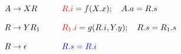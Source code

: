 
\begin{alignat*}{3}
  A &\to XR \qquad && \textcolor{red}{R.i} = f(X.x);\quad A.a = R.s \\[8pt]
  R &\to YR_{1} && \textcolor{red}{R_{1}.i} = g(R.i, Y.y);\quad R.s = R_{1}.s \\[8pt]
  R &\to \epsilon && \textcolor{blue}{R.s = R.i}
\end{alignat*}